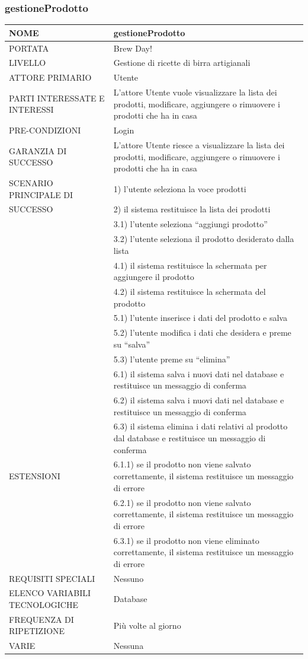 \documentclass[a4paper, titlepage]{article}
\begin{document}
\subsubsection{gestioneProdotto}
\begin{longtable}{p{6cm}p{7cm}}\toprule
    NOME & gestioneProdotto\\\midrule
    PORTATA & Brew Day!\\\midrule
    LIVELLO & Gestione di ricette di birra artigianali\\\midrule
    ATTORE PRIMARIO & Utente\\\midrule
    PARTI INTERESSATE E INTERESSI & L’attore Utente vuole visualizzare la lista dei prodotti, modificare, aggiungere o rimuovere i prodotti che ha in casa\\\midrule
    PRE-CONDIZIONI & Login\\\midrule
    GARANZIA DI SUCCESSO &  L’attore Utente riesce a visualizzare la lista dei prodotti, modificare, aggiungere o rimuovere i prodotti che ha in casa\\\midrule
    SCENARIO PRINCIPALE DI
    & 1) l’utente seleziona la voce prodotti\\
    SUCCESSO & 2) il sistema restituisce la lista dei prodotti\\
    & 3.1) l’utente seleziona “aggiungi prodotto”\\
    & 3.2) l’utente seleziona il prodotto desiderato dalla lista\\
    & 4.1) il sistema restituisce la schermata per aggiungere il prodotto\\
    & 4.2) il sistema restituisce la schermata del prodotto\\
    & 5.1) l’utente inserisce i dati del prodotto e salva\\
    & 5.2) l’utente modifica i dati che desidera e preme su “salva”\\
    & 5.3) l’utente preme su “elimina”\\
    & 6.1) il sistema salva i nuovi dati nel database e restituisce un messaggio di conferma\\
    & 6.2) il sistema salva i nuovi dati nel database e restituisce un messaggio di conferma\\
    & 6.3) il sistema elimina i dati relativi al prodotto dal database e restituisce un messaggio di conferma\\\midrule
    ESTENSIONI
    & 6.1.1) se il prodotto non viene salvato correttamente, il sistema restituisce un messaggio di errore\\
    & 6.2.1) se il prodotto non viene salvato correttamente, il sistema restituisce un messaggio di errore\\
    & 6.3.1) se il prodotto non viene eliminato correttamente, il sistema restituisce un messaggio di errore \\\midrule
    REQUISITI SPECIALI & Nessuno\\\midrule
    ELENCO VARIABILI TECNOLOGICHE & Database\\\midrule
    FREQUENZA DI RIPETIZIONE & Più volte al giorno\\\midrule
    VARIE & Nessuna\\\bottomrule
\end{longtable}
\vphantom{}
\end{document}
